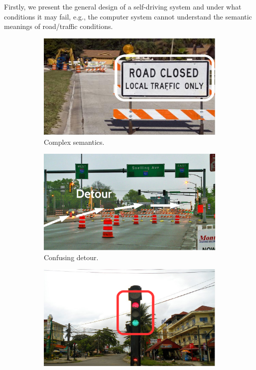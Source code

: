 
Firstly, we present the general design of a self-driving system and
under what conditions it may fail, e.g., the computer system cannot 
understand the semantic meanings of road/traffic conditions. 


\begin{figure}[ht]
\centering
  \begin{subfigure}[t]{0.33\textwidth}
    \includegraphics[width=\linewidth]{Figs/RTDrive/motivation/local_traffic.jpeg}
    \vspace{-0.2cm}
    \caption{Complex semantics.}
    \label{motivation:local_traffic}
  \end{subfigure}%
 \begin{subfigure}[t]{0.33\textwidth}
    \includegraphics[width=\linewidth]{Figs/RTDrive/motivation/detour.jpg}
    \vspace{-0.2cm}
    \caption{Confusing detour.}
    \label{motivation:detour}
  \end{subfigure}%
  \begin{subfigure}[t]{0.33\textwidth}
    \includegraphics[width=\linewidth]{Figs/RTDrive/motivation/malfunctioning_traffic_light.jpg}

\end{subfigure}
\end{figure}
